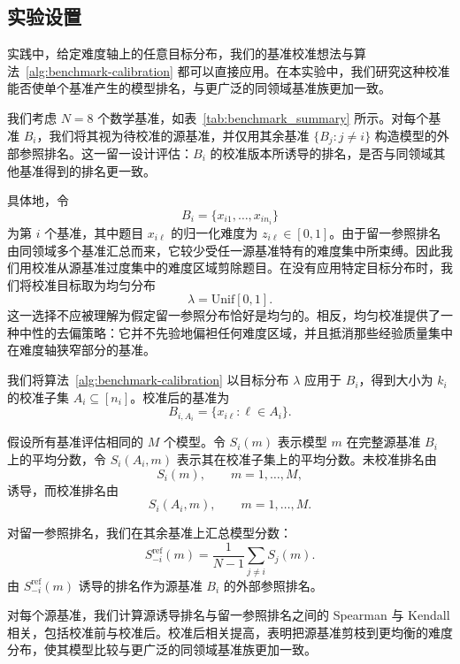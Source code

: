 \subsection{实验设置}

实践中，给定难度轴上的任意目标分布，我们的基准校准想法与算法~\ref{alg:benchmark-calibration} 都可以直接应用。在本实验中，我们研究这种校准能否使单个基准产生的模型排名，与更广泛的同领域基准族更加一致。

我们考虑 \(N=8\) 个数学基准，如表~\ref{tab:benchmark_summary} 所示。对每个基准 \(B_i\)，我们将其视为待校准的源基准，并仅用其余基准 \(\{B_j:j\neq i\}\) 构造模型的外部参照排名。这一留一设计评估：\(B_i\) 的校准版本所诱导的排名，是否与同领域其他基准得到的排名更一致。

具体地，令
\[
B_i=\{x_{i1},\ldots,x_{in_i}\}
\]
为第 \(i\) 个基准，其中题目 \(x_{i\ell}\) 的归一化难度为 \(z_{i\ell}\in[0,1]\)。由于留一参照排名由同领域多个基准汇总而来，它较少受任一源基准特有的难度集中所束缚。因此我们用校准从源基准过度集中的难度区域剪除题目。在没有应用特定目标分布时，我们将校准目标取为均匀分布
\[
\lambda=\mathrm{Unif}[0,1].
\]
这一选择不应被理解为假定留一参照分布恰好是均匀的。相反，均匀校准提供了一种中性的去偏策略：它并不先验地偏袒任何难度区域，并且抵消那些经验质量集中在难度轴狭窄部分的基准。

我们将算法~\ref{alg:benchmark-calibration} 以目标分布 \(\lambda\) 应用于 \(B_i\)，得到大小为 \(k_i\) 的校准子集 \(A_i\subseteq[n_i]\)。校准后的基准为
\[
B_{i,A_i}=\{x_{i\ell}:\ell\in A_i\}.
\]

假设所有基准评估相同的 \(M\) 个模型。令 \(S_i(m)\) 表示模型 \(m\) 在完整源基准 \(B_i\) 上的平均分数，令 \(S_i(A_i,m)\) 表示其在校准子集上的平均分数。未校准排名由
\[
S_i(m),\qquad m=1,\ldots,M,
\]
诱导，而校准排名由
\[
S_i(A_i,m),\qquad m=1,\ldots,M.
\]

对留一参照排名，我们在其余基准上汇总模型分数：
\[
S^{\mathrm{ref}}_{-i}(m)
=
\frac{1}{N-1}\sum_{j\neq i} S_j(m).
\]
由 \(S^{\mathrm{ref}}_{-i}(m)\) 诱导的排名作为源基准 \(B_i\) 的外部参照排名。

对每个源基准，我们计算源诱导排名与留一参照排名之间的 Spearman 与 Kendall 相关，包括校准前与校准后。校准后相关提高，表明把源基准剪枝到更均衡的难度分布，使其模型比较与更广泛的同领域基准族更加一致。

